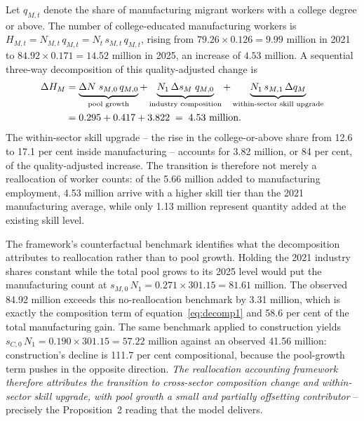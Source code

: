 \documentclass[12pt]{article}
\begin{document}
Let $q_{M,t}$ denote the share of manufacturing migrant workers with a college degree or above. The number of college-educated manufacturing workers is $H_{M,t}=N_{M,t}\,q_{M,t}=N_t\,s_{M,t}\,q_{M,t}$, rising from $79.26\times0.126=9.99$ million in 2021 to $84.92\times0.171=14.52$ million in 2025, an increase of $4.53$ million. A sequential three-way decomposition of this quality-adjusted change is
\begin{align}
\Delta H_M &= \underbrace{\Delta N\;s_{M,0}\,q_{M,0}}_{\text{pool growth}}
           + \underbrace{N_1\,\Delta s_M\;q_{M,0}}_{\text{industry composition}}
           + \underbrace{N_1\,s_{M,1}\,\Delta q_M}_{\text{within-sector skill upgrade}} \notag\\
          &= 0.295 + 0.417 + 3.822 \;=\; 4.53\ \text{million}. \label{eq:quality}
\end{align}
The within-sector skill upgrade -- the rise in the college-or-above share from 12.6 to 17.1 per cent inside manufacturing -- accounts for 3.82 million, or 84 per cent, of the quality-adjusted increase. The transition is therefore not merely a reallocation of worker counts: of the 5.66 million added to manufacturing employment, 4.53 million arrive with a higher skill tier than the 2021 manufacturing average, while only 1.13 million represent quantity added at the existing skill level.

The framework's counterfactual benchmark identifies what the decomposition attributes to reallocation rather than to pool growth. Holding the 2021 industry shares constant while the total pool grows to its 2025 level would put the manufacturing count at $s_{M,0}\,N_1=0.271\times301.15=81.61$ million. The observed 84.92 million exceeds this no-reallocation benchmark by 3.31 million, which is exactly the composition term of equation~\eqref{eq:decomp1} and 58.6 per cent of the total manufacturing gain. The same benchmark applied to construction yields $s_{C,0}\,N_1=0.190\times301.15=57.22$ million against an observed 41.56 million: construction's decline is 111.7 per cent compositional, because the pool-growth term pushes in the opposite direction. \emph{The reallocation accounting framework therefore attributes the transition to cross-sector composition change and within-sector skill upgrade, with pool growth a small and partially offsetting contributor} -- precisely the Proposition~2 reading that the model delivers.
\end{document}
